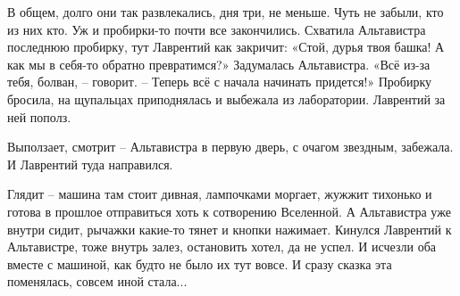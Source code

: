 \documentclass[ebook,oneside,final,openright]{memoir}
\begin{document}
\par
В общем, долго они так развлекались, дня три, не меньше. Чуть не забыли, кто из них кто. Уж и пробирки-то почти все закончились. Схватила Альтавистра последнюю пробирку, тут Лаврентий как закричит: «Стой, дурья твоя башка! А как мы в себя-то обратно превратимся?» Задумалась Альтавистра. «Всё из-за тебя, болван, – говорит. – Теперь всё с начала начинать придется!» Пробирку бросила, на щупальцах приподнялась и выбежала из лаборатории. Лаврентий за ней пополз.\par
\par
Выползает, смотрит – Альтавистра в первую дверь, с очагом звездным, забежала. И Лаврентий туда направился.\par
\par
Глядит – машина там стоит дивная, лампочками моргает, жужжит тихонько и готова в прошлое отправиться хоть к сотворению Вселенной. А Альтавистра уже внутри сидит, рычажки какие-то тянет и кнопки нажимает. Кинулся Лаврентий к Альтавистре, тоже внутрь залез, остановить хотел, да не успел. И исчезли оба вместе с машиной, как будто не было их тут вовсе. И сразу сказка эта поменялась, совсем иной стала...\par
\end{document}
